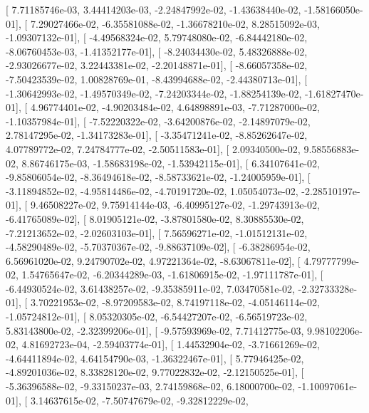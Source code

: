 \documentclass{article}
\begin{document}
       [  7.71185746e-03,   3.44414203e-03,  -2.24847992e-02,
         -1.43638440e-02,  -1.58166050e-01],
       [  7.29027466e-02,  -6.35581088e-02,  -1.36678210e-02,
          8.28515092e-03,  -1.09307132e-01],
       [ -4.49568324e-02,   5.79748080e-02,  -6.84442180e-02,
         -8.06760453e-03,  -1.41352177e-01],
       [ -8.24034430e-02,   5.48326888e-02,  -2.93026677e-02,
          3.22443381e-02,  -2.20148871e-01],
       [ -8.66057358e-02,  -7.50423539e-02,   1.00828769e-01,
         -8.43994688e-02,  -2.44380713e-01],
       [ -1.30642993e-02,  -1.49570349e-02,  -7.24203344e-02,
         -1.88254139e-02,  -1.61827470e-01],
       [  4.96774401e-02,  -4.90203484e-02,   4.64898891e-03,
         -7.71287000e-02,  -1.10357984e-01],
       [ -7.52220322e-02,  -3.64200876e-02,  -2.14897079e-02,
          2.78147295e-02,  -1.34173283e-01],
       [ -3.35471241e-02,  -8.85262647e-02,   4.07789772e-02,
          7.24784777e-02,  -2.50511583e-01],
       [  2.09340500e-02,   9.58556883e-02,   8.86746175e-03,
         -1.58683198e-02,  -1.53942115e-01],
       [  6.34107641e-02,  -9.85806054e-02,  -8.36494618e-02,
         -8.58733621e-02,  -1.24005959e-01],
       [ -3.11894852e-02,  -4.95814486e-02,  -4.70191720e-02,
          1.05054073e-02,  -2.28510197e-01],
       [  9.46508227e-02,   9.75914144e-03,  -6.40995127e-02,
         -1.29743913e-02,  -6.41765089e-02],
       [  8.01905121e-02,  -3.87801580e-02,   8.30885530e-02,
         -7.21213652e-02,  -2.02603103e-01],
       [  7.56596271e-02,  -1.01512131e-02,  -4.58290489e-02,
         -5.70370367e-02,  -9.88637109e-02],
       [ -6.38286954e-02,   6.56961020e-02,   9.24790702e-02,
          4.97221364e-02,  -8.63067811e-02],
       [  4.79777799e-02,   1.54765647e-02,  -6.20344289e-03,
         -1.61806915e-02,  -1.97111787e-01],
       [ -6.44930524e-02,   3.61438257e-02,  -9.35385911e-02,
          7.03470581e-02,  -2.32733328e-01],
       [  3.70221953e-02,  -8.97209583e-02,   8.74197118e-02,
         -4.05146114e-02,  -1.05724812e-01],
       [  8.05320305e-02,  -6.54427207e-02,  -6.56519723e-02,
          5.83143800e-02,  -2.32399206e-01],
       [ -9.57593969e-02,   7.71412775e-03,   9.98102206e-02,
          4.81692723e-04,  -2.59403774e-01],
       [  1.44532904e-02,  -3.71661269e-02,  -4.64411894e-02,
          4.64154790e-03,  -1.36322467e-01],
       [  5.77946425e-02,  -4.89201036e-02,   8.33828120e-02,
          9.77022832e-02,  -2.12150525e-01],
       [ -5.36396588e-02,  -9.33150237e-03,   2.74159868e-02,
          6.18000700e-02,  -1.10097061e-01],
       [  3.14637615e-02,  -7.50747679e-02,  -9.32812229e-02,
\end{document}
